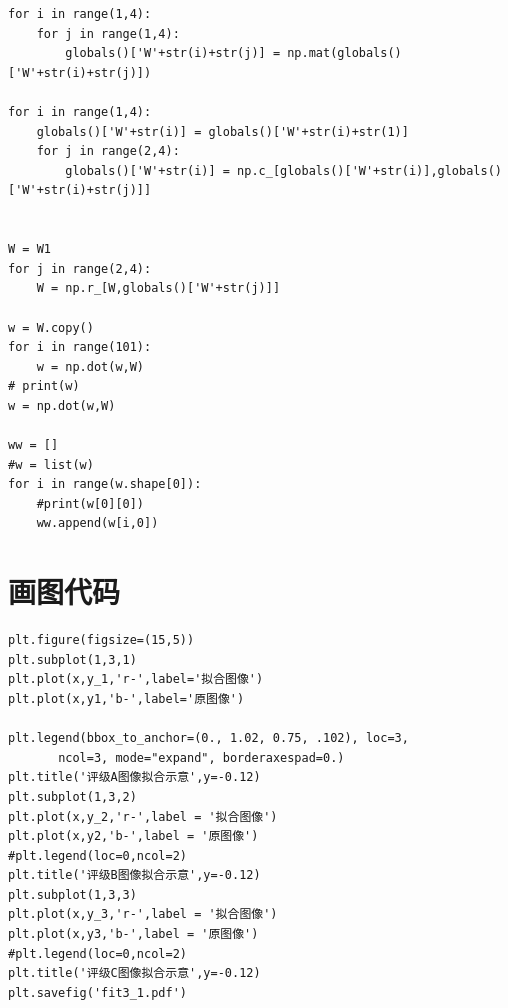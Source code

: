 \documentclass[withoutpreface,bwprint]{cumcmthesis}
\begin{document}
\begin{lstlisting}
for i in range(1,4):
    for j in range(1,4):
        globals()['W'+str(i)+str(j)] = np.mat(globals()['W'+str(i)+str(j)])
        
for i in range(1,4):
    globals()['W'+str(i)] = globals()['W'+str(i)+str(1)]
    for j in range(2,4):
        globals()['W'+str(i)] = np.c_[globals()['W'+str(i)],globals()['W'+str(i)+str(j)]]

        
W = W1
for j in range(2,4):
    W = np.r_[W,globals()['W'+str(j)]]

w = W.copy()
for i in range(101):
    w = np.dot(w,W)
# print(w)
w = np.dot(w,W)

ww = []
#w = list(w)
for i in range(w.shape[0]):
    #print(w[0][0])
    ww.append(w[i,0])
    \end{lstlisting}\newpage



    \section{画图代码}
    \begin{lstlisting}
plt.figure(figsize=(15,5))
plt.subplot(1,3,1)
plt.plot(x,y_1,'r-',label='拟合图像')
plt.plot(x,y1,'b-',label='原图像')

plt.legend(bbox_to_anchor=(0., 1.02, 0.75, .102), loc=3,
       ncol=3, mode="expand", borderaxespad=0.)
plt.title('评级A图像拟合示意',y=-0.12)
plt.subplot(1,3,2)
plt.plot(x,y_2,'r-',label = '拟合图像')
plt.plot(x,y2,'b-',label = '原图像')
#plt.legend(loc=0,ncol=2)
plt.title('评级B图像拟合示意',y=-0.12)
plt.subplot(1,3,3)
plt.plot(x,y_3,'r-',label = '拟合图像')
plt.plot(x,y3,'b-',label = '原图像')
#plt.legend(loc=0,ncol=2)
plt.title('评级C图像拟合示意',y=-0.12)
plt.savefig('fit3_1.pdf')
    \end{lstlisting}
\end{document}
